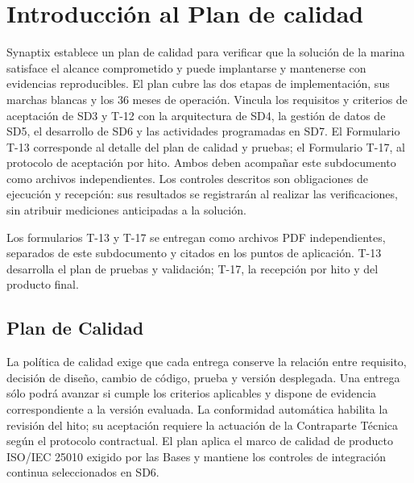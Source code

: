 \chapter{Introducción al Plan de calidad}
Synaptix establece un plan de calidad para verificar que la solución de la marina satisface el alcance comprometido y puede implantarse y mantenerse con evidencias reproducibles. El plan cubre las dos etapas de implementación, sus marchas blancas y los 36 meses de operación. Vincula los requisitos y criterios de aceptación de SD3 y T-12 con la arquitectura de SD4, la gestión de datos de SD5, el desarrollo de SD6 y las actividades programadas en SD7. El Formulario T-13 corresponde al detalle del plan de calidad y pruebas; el Formulario T-17, al protocolo de aceptación por hito. Ambos deben acompañar este subdocumento como archivos independientes. Los controles descritos son obligaciones de ejecución y recepción: sus resultados se registrarán al realizar las verificaciones, sin atribuir mediciones anticipadas a la solución.

Los formularios T-13 y T-17 se entregan como archivos PDF independientes, separados de este subdocumento y citados en los puntos de aplicación. T-13 desarrolla el plan de pruebas y validación; T-17, la recepción por hito y del producto final. \parencite{sd9-t13,sd9-t17}

\section{Plan de Calidad}
La política de calidad exige que cada entrega conserve la relación entre requisito, decisión de diseño, cambio de código, prueba y versión desplegada. Una entrega sólo podrá avanzar si cumple los criterios aplicables y dispone de evidencia correspondiente a la versión evaluada. La conformidad automática habilita la revisión del hito; su aceptación requiere la actuación de la Contraparte Técnica según el protocolo contractual. El plan aplica el marco de calidad de producto ISO/IEC 25010 exigido por las Bases y mantiene los controles de integración continua seleccionados en SD6. \parencites[art.~24, p.~17]{sd9-ba}[cap.~20, pp.~34--35]{sd9-bt}

